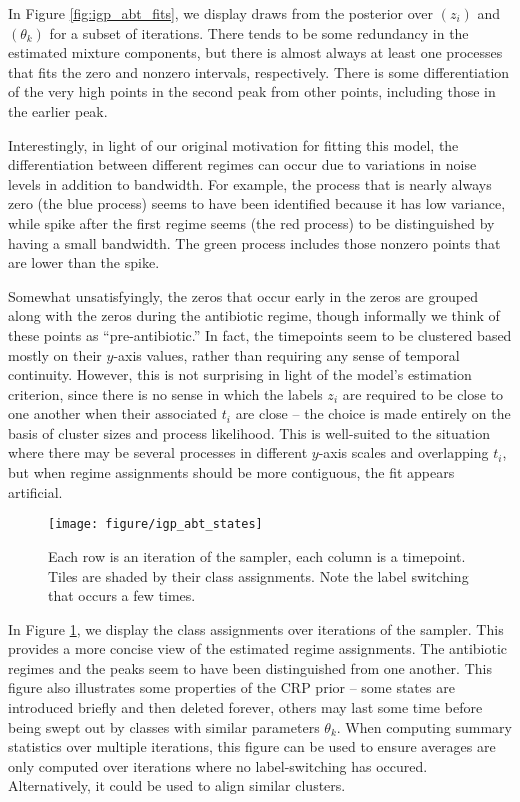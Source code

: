 \documentclass{article}
\begin{document}
In Figure \ref{fig:igp_abt_fits}, we display draws from the posterior over
$\left(z_i\right)$ and $\left(\theta_k\right)$ for a subset of iterations. There
tends to be some redundancy in the estimated mixture components, but there is
almost always at least one processes that fits the zero and nonzero intervals,
respectively. There is some differentiation of the very high points in the
second peak from other points, including those in the earlier peak.

Interestingly, in light of our original motivation for fitting this model, the
differentiation between different regimes can occur due to variations in noise
levels in addition to bandwidth. For example, the process that is nearly always
zero (the blue process) seems to have been identified because it has low
variance, while spike after the first regime seems (the red process) to be
distinguished by having a small bandwidth. The green process includes those
nonzero points that are lower than the spike.

Somewhat unsatisfyingly, the zeros that occur early in the zeros are grouped
along with the zeros during the antibiotic regime, though informally we think of
these points as ``pre-antibiotic.'' In fact, the timepoints seem to be clustered
based mostly on their $y$-axis values, rather than requiring any sense of
temporal continuity. However, this is not surprising in light of the model's
estimation criterion, since there is no sense in which the labels $z_i$ are
required to be close to one another when their associated $t_i$ are close -- the
choice is made entirely on the basis of cluster sizes and process likelihood.
This is well-suited to the situation where there may be several processes in
different $y$-axis scales and overlapping $t_i$, but when regime assignments
should be more contiguous, the fit appears artificial.

\begin{figure}[ht]
  \centering
  \texttt{[image: figure/igp\_abt\_states]}
  \caption{Each row is an iteration of the sampler, each column is a timepoint.
    Tiles are shaded by their class assignments. Note the label switching that
    occurs a few times. \label{fig:igp_abt_states} }
\end{figure}

In Figure \ref{fig:igp_abt_states}, we display the class assignments over
iterations of the sampler. This provides a more concise view of the estimated
regime assignments. The antibiotic regimes and the peaks seem to have been
distinguished from one another. This figure also illustrates some properties of
the CRP prior -- some states are introduced briefly and then deleted forever,
others may last some time before being swept out by classes with similar
parameters $\theta_k$. When computing summary statistics over multiple
iterations, this figure can be used to ensure averages are only computed over
iterations where no label-switching has occured. Alternatively, it could be used
to align similar clusters.
\end{document}
